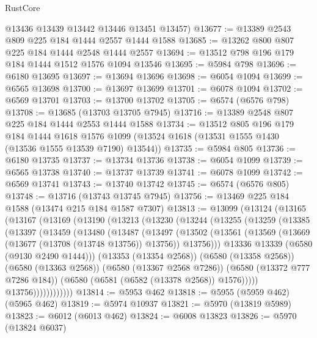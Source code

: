 \begin{lexlean}{RustCore}
\begin{coremodule}
{\begin{coremodule}
{{{{{{{{{{{{{{{{{{{{{{{{{{{{{{{{{{{{{{{{{{{{{      @13436
      @13439
      @13442
      @13446
      @13451
      @13457)
@13677 := @13389 @2543 @809 @225 @184 @1444 @2557 @1444 @1588
@13685 := @13262 @800 @807 @225 @184 @1444 @2548 @1444 @2557
@13694 := @13512 @798 @196 @179 @184 @1444 @1512 @1576 @1094 @13546
@13695 := @5984 @798
@13696 := @6180 @13695
@13697 := @13694 @13696
@13698 := @6054 @1094
@13699 := @6565 @13698
@13700 := @13697 @13699
@13701 := @6078 @1094
@13702 := @6569 @13701
@13703 := @13700 @13702
@13705 := @6574 (@6576 @798)
@13708 := @13685 (@13703 @13705 @7945)
@13716 := @13389 @2548 @807 @225 @184 @1444 @2553 @1444 @1588
@13734 := @13512
    @805
    @196
    @179
    @184
    @1444
    @1618
    @1576
    @1099
    (@13524 @1618 (@13531 @1555 @1430 (@13536 @1555 @13539 @7190) @13544))
@13735 := @5984 @805
@13736 := @6180 @13735
@13737 := @13734 @13736
@13738 := @6054 @1099
@13739 := @6565 @13738
@13740 := @13737 @13739
@13741 := @6078 @1099
@13742 := @6569 @13741
@13743 := @13740 @13742
@13745 := @6574 (@6576 @805)
@13748 := @13716 (@13743 @13745 @7945)
@13756 := @13469 @225 @184 @1588 (@13474 @215 @184 @1587 @7307)
@13813 := @13099
    (@13124
      (@13165
        (@13167
          (@13169
            (@13190
              (@13213
                (@13230
                  (@13244
                    (@13255
                      (@13259
                        (@13385
                          (@13397
                            (@13459
                              (@13480
                                (@13487
                                  (@13497
                                    (@13502
                                      (@13561
                                        (@13569
                                          (@13669 (@13677 (@13708 (@13748 @13756)) @13756))
                                          @13756)))
                                    @13336
                                    @13339
                                    (@6580 (@9130 @2490 @1444)))
                                  (@13353 (@13354 @2568))
                                  (@6580 (@13358 @2568))
                                  (@6580 (@13363 @2568))
                                  (@6580 (@13367 @2568 @7286))
                                  (@6580 (@13372 @777 @7286 @184))
                                  (@6580 (@6581 (@6582 (@13378 @2568)) @1576)))))
                            @13756))))))))))))
@13814 := @5953 @462
@13818 := @5955 (@5959 @462) (@5965 @462)
@13819 := @5974 @10937
@13821 := @5970 (@13819 @5989)
@13823 := @6012 (@6013 @462)
@13824 := @6008 @13823
@13826 := @5970 (@13824 @6037)
}}}}}}}}}}}}}}}}}}}}}}}}}}}}}}}}}}}}}}}}}}}}}
\end{coremodule}}
\end{coremodule}
\end{lexlean}
